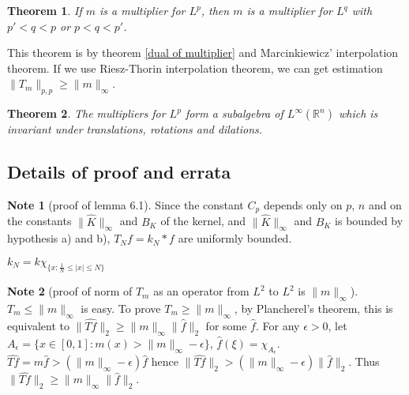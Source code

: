 \documentclass{report}
\theoremstyle{definition}
\newtheorem{note}{Note}
\theoremstyle{definition}
\theoremstyle{plain}
\newtheorem{theorem}{Theorem}
\numberwithin{theorem}{subsection}
\numberwithin{remark}{subsection}
\newcommand{\norm}[1]{\lVert#1\rVert}
\newcommand{\abs}[1]{\left\lvert#1\right\rvert}
\begin{document}
\begin{theorem}
    If $m$ is a multiplier for $L^p$, then $m$ is a multiplier for $L^q$ with $p'<q<p$ or $p<q<p'$.
\end{theorem}
This theorem is by theorem \ref{dual of multiplier} and Marcinkiewicz' interpolation theorem. If we use Riesz-Thorin interpolation
theorem, we can get estimation $\norm{T_m}_{p,p}\geq\norm{m}_\infty$.\par
\begin{theorem}
    The multipliers for $L^p$ form a subalgebra of $L^\infty(\mathbb{R}^n)$ which is invariant under
    translations, rotations and dilations.
\end{theorem}


\subsection{Details of proof and errata}\label{details}
\begin{note}[proof of lemma 6.1]
    Since the constant $C_p$ depends only on $p$, $n$ and on the constants $\norm{\hat{K}}_{\infty}$ and $B_K$ of
    the kernel, and $\norm{\hat{K}}_\infty$ and $B_K$ is bounded by hypothesis a) and b), $T_Nf=k_N*f$ are uniformly bounded.
\end{note}
\begin{errata}[P209]
    $k_N=k\chi_{\{x:\frac{1}{N}\leq \abs{x}\leq N\}}$
\end{errata}
\begin{note}[proof of norm of $T_m$ as an operator from $L^2$ to $L^2$ is $\norm{m}_\infty$]
    $T_m\leq\norm{m}_\infty$ is easy. To prove $T_m\geq\norm{m}_\infty$, by Plancherel's theorem, this is equivalent to
    $\norm{\hat{Tf}}_2\geq\norm{m}_\infty\norm{\hat{f}}_2$ for some $\hat{f}$. For any $\epsilon>0$, let $A_\epsilon=\{x\in [0,1]:m(x)>\norm{m}_\infty-\epsilon\}$, $\hat{f}(\xi)=\chi_{A_\epsilon}$.
    $\hat{Tf}=m\hat{f}>(\norm{m}_\infty-\epsilon)\hat{f}$ hence $\norm{\hat{Tf}}_2>(\norm{m}_\infty-\epsilon)\norm{\hat{f}}_2$. Thus $\norm{\hat{Tf}}_2\geq\norm{m}_\infty\norm{\hat{f}}_2$.
\end{note}
\end{document}
